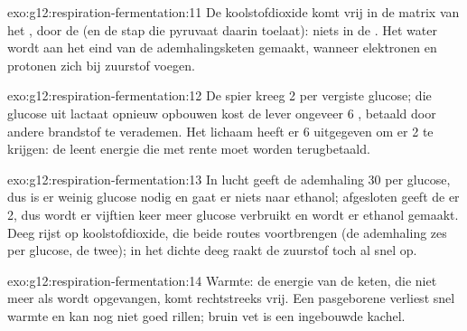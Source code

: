 \begin{solution}{exo:g12:respiration-fermentation:11}
De koolstofdioxide komt vrij in de matrix van het , door de
 (en de stap die pyruvaat daarin toelaat): niets in de
. Het water wordt aan het eind van de ademhalingsketen gemaakt,
wanneer elektronen en protonen zich bij zuurstof voegen.
\end{solution}

\begin{solution}{exo:g12:respiration-fermentation:12}
De spier kreeg 2  per vergiste glucose; die glucose uit lactaat
opnieuw opbouwen kost de lever ongeveer 6 , betaald door andere
brandstof te verademen. Het lichaam heeft er 6 uitgegeven om er 2 te
krijgen: de  leent energie die met rente moet worden terugbetaald.
\end{solution}

\begin{solution}{exo:g12:respiration-fermentation:13}
In lucht geeft de ademhaling 30  per glucose, dus is er weinig glucose
nodig en gaat er niets naar ethanol; afgesloten geeft de  er 2, dus
wordt er vijftien keer meer glucose verbruikt en wordt er ethanol gemaakt.
Deeg rijst op koolstofdioxide, die beide routes voortbrengen (de
ademhaling zes per glucose, de  twee); in het dichte deeg raakt de
zuurstof toch al snel op.
\end{solution}

\begin{solution}{exo:g12:respiration-fermentation:14}
Warmte: de energie van de keten, die niet meer als  wordt opgevangen,
komt rechtstreeks vrij. Een pasgeborene verliest snel warmte en kan nog
niet goed rillen; bruin vet is een ingebouwde kachel.
\end{solution}

